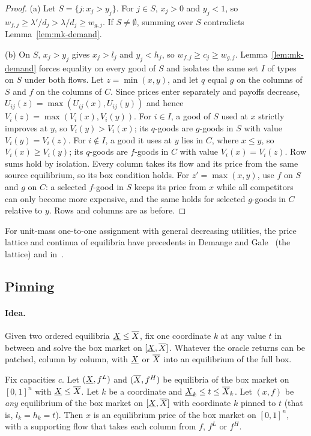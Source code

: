 \begin{proof}
(a) Let $S=\{j:x_j>y_j\}$. For $j\in S$, $x_j>0$ and $y_j<1$, so
$w_{f,j}\ge\lambda'/d_j>\lambda/d_j\ge w_{g,j}$. If $S\ne\emptyset$, summing over $S$ contradicts
Lemma~\ref{lem:mk-demand}.

(b) On $S$, $x_j>y_j$ gives $x_j>l_j$ and $y_j<h_j$, so $w_{f,j}\ge c_j\ge w_{g,j}$.
Lemma~\ref{lem:mk-demand} forces equality on every good of $S$ and isolates the same set $I$ of types on
$S$ under both flows. Let $z=\min(x,y)$, and let $q$ equal $g$ on the columns of $S$ and $f$ on the
columns of $C$. Since prices enter separately and payoffs decrease, $U_{ij}(z)=\max(U_{ij}(x),U_{ij}(y))$
and hence $V_i(z)=\max(V_i(x),V_i(y))$. For $i\in I$, a good of $S$ used at $x$ strictly improves at $y$,
so $V_i(y)>V_i(x)$; its $q$-goods are $g$-goods in $S$ with value $V_i(y)=V_i(z)$. For $i\notin I$, a good
it uses at $y$ lies in $C$, where $x\le y$, so $V_i(x)\ge V_i(y)$; its $q$-goods are $f$-goods in $C$ with
value $V_i(x)=V_i(z)$. Row sums hold by isolation. Every column takes its flow and its price from the
same source equilibrium, so its box condition holds. For $z'=\max(x,y)$, use $f$ on $S$ and $g$ on $C$:
a selected $f$-good in $S$ keeps its price from $x$ while all competitors can only become more
expensive, and the same holds for selected $g$-goods in $C$ relative to $y$. Rows and columns are as
before.
\end{proof}

For unit-mass one-to-one assignment with general decreasing utilities, the price lattice and continua
of equilibria have precedents in Demange and Gale~\cite{dg85} (the lattice) and in~\cite[\S4]{alaei12}.

\subsection{Pinning}

\paragraph{Idea.} Given two ordered equilibria $\underline{X}{}\le \overline{X}{}$, fix one coordinate $k$ at any value $t$ in
between and solve the box market on $[\underline{X}{},\overline{X}{}]$. Whatever the oracle returns can be patched, column by
column, with $\underline{X}{}$ or $\overline{X}{}$ into an equilibrium of the full box.

\begin{lemma}[Pinning]\label{lem:mk-pin}
Fix capacities $c$. Let $(\underline{X}{},f^L)$ and $(\overline{X}{},f^H)$ be equilibria of the box market on $[0,1]^n$ with
$\underline{X}{}\le \overline{X}{}$. Let $k$ be a coordinate and $\underline{X}_k\le t\le \overline{X}_k$. Let $(x,f)$ be \emph{any} equilibrium of the
box market on $[\underline{X}{},\overline{X}{}]$ with coordinate $k$ pinned to $t$ (that is, $l_k=h_k=t$). Then $x$ is an
equilibrium price of the box market on $[0,1]^n$, with a supporting flow that takes each column from
$f$, $f^L$ or $f^H$.
\end{lemma}

